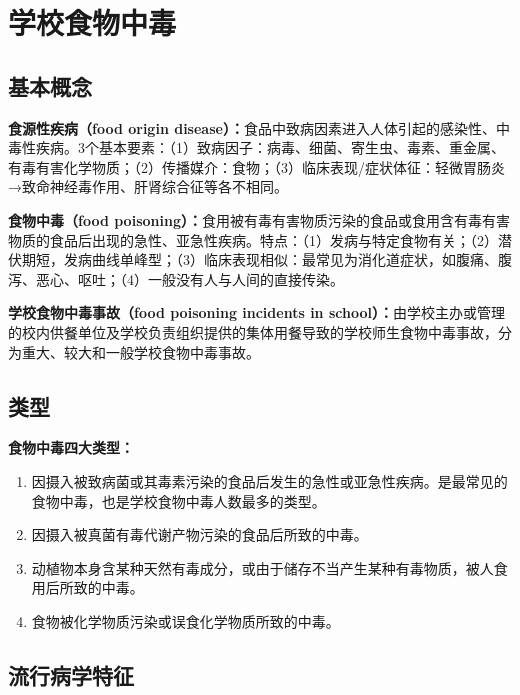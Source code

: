 \section{学校食物中毒}

\subsection{基本概念}

\begin{defbox}
\textbf{食源性疾病（food origin disease）：}食品中致病因素进入人体引起的感染性、中毒性疾病。3个基本要素：（1）致病因子：病毒、细菌、寄生虫、毒素、重金属、有毒有害化学物质；（2）传播媒介：食物；（3）临床表现/症状体征：轻微胃肠炎→致命神经毒作用、肝肾综合征等各不相同。

\textbf{食物中毒（food poisoning）：}食用被有毒有害物质污染的食品或食用含有毒有害物质的食品后出现的急性、亚急性疾病。特点：（1）发病与特定食物有关；（2）潜伏期短，发病曲线单峰型；（3）临床表现相似：最常见为消化道症状，如腹痛、腹泻、恶心、呕吐；（4）一般没有人与人间的直接传染。

\textbf{学校食物中毒事故（food poisoning incidents in school）：}由学校主办或管理的校内供餐单位及学校负责组织提供的集体用餐导致的学校师生食物中毒事故，分为重大、较大和一般学校食物中毒事故。
\end{defbox}

\subsection{类型}

\begin{keybox}
\textbf{食物中毒四大类型：}

\begin{enumerate}[leftmargin=*]
    \item {}因摄入被致病菌或其毒素污染的食品后发生的急性或亚急性疾病。是最常见的食物中毒，也是学校食物中毒人数最多的类型。
    \item {}因摄入被真菌有毒代谢产物污染的食品后所致的中毒。
    \item {}动植物本身含某种天然有毒成分，或由于储存不当产生某种有毒物质，被人食用后所致的中毒。
    \item {}食物被化学物质污染或误食化学物质所致的中毒。
\end{enumerate}
\end{keybox}

\subsection{流行病学特征}

